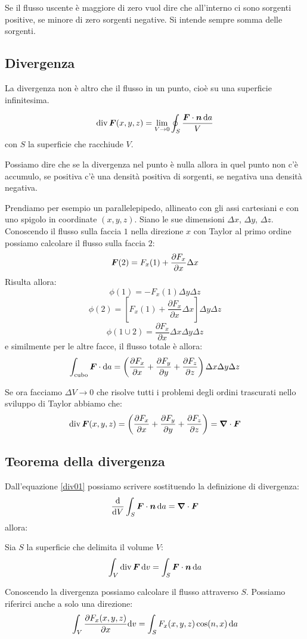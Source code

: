 Se il flusso uscente è maggiore di zero vuol dire che all'interno ci sono sorgenti positive, se minore di zero sorgenti negative. Si intende sempre somma delle sorgenti.
\subsection{Divergenza}
La divergenza non è altro che il flusso in un punto, cioè su una superficie infinitesima.
\begin{Def}
  \[\operatorname{div} \boldsymbol{F}(x,y,z)=\lim_{V\to 0}\oint_S \frac{\boldsymbol{F}\cdot \boldsymbol{n}\,\mathrm{d} a}{V}\]
  con $S$ la superficie che racchiude $V$.
\end{Def}

Possiamo dire che se la divergenza nel punto è nulla allora in quel punto non c'è accumulo, se positiva c'è una densità positiva di sorgenti, se negativa una densità negativa.

Prendiamo per esempio un parallelepipedo, allineato con gli assi cartesiani e con uno spigolo in coordinate $(x,y,z)$. Siano le sue dimensioni $\Delta x$, $\Delta y$, $\Delta z$. Conoscendo il flusso sulla faccia $1$ nella direzione $x$ con Taylor al primo ordine possiamo calcolare il flusso sulla faccia $2$:
\[\boldsymbol{F}(2)= F_x(1)+\frac{\partial F_x}{\partial x}\Delta x\]
Risulta allora:
\[\phi(1)=- F_x(1)\Delta y\Delta z\]
\[\phi(2)=\left[F_x(1)+\frac{\partial F_x}{\partial x}\Delta x\right]\Delta y\Delta z\]
\[\phi(1\cup 2)=\frac{\partial F_x}{\partial x}\Delta x\Delta y\Delta z\]
e similmente per le altre facce, il flusso totale è allora:
\[\int_{\text{cubo}} \boldsymbol{F}\cdot\mathrm{d} a=\left(\frac{\partial F_x}{\partial x}+\frac{\partial F_y}{\partial y}+\frac{\partial F_z}{\partial z}\right)\Delta x\Delta y\Delta z\]


Se ora facciamo $\Delta V\to 0$ che risolve tutti i problemi degli ordini trascurati nello sviluppo di Taylor abbiamo che:
\begin{equation}\label{div01}
  \operatorname{div} \boldsymbol{F}(x,y,z)=\left(\frac{\partial F_x}{\partial x}+\frac{\partial F_y}{\partial y}+\frac{\partial F_z}{\partial z}\right)=\boldsymbol{\nabla}\cdot\boldsymbol{F}\end{equation}

\subsection{Teorema della divergenza}
Dall'equazione \eqref{div01} possiamo scrivere sostituendo la definizione di divergenza:
\[\frac{\mathrm{d}}{\mathrm{d} V}\int_S \boldsymbol{F}\cdot\boldsymbol{n}\,\mathrm{d} a=\boldsymbol{\nabla}\cdot\boldsymbol{F}\]
allora:
\begin{Teo}[divergenza]
  Sia $S$ la superficie che delimita il volume $V$:
  \[\int_V\operatorname{div} \boldsymbol{F}\,\mathrm{d} v=\int_S\boldsymbol{F}\cdot\boldsymbol{n}\,\mathrm{d} a\]
\end{Teo}
Conoscendo la divergenza possiamo calcolare il flusso attraverso $S$. Possiamo riferirci anche a solo una direzione:
\[\int_V\frac{\partial F_x(x,y,z)}{\partial x}\mathrm{d} v=\int_S F_x(x,y,z)\cos(n,x)\,\mathrm{d} a\]

